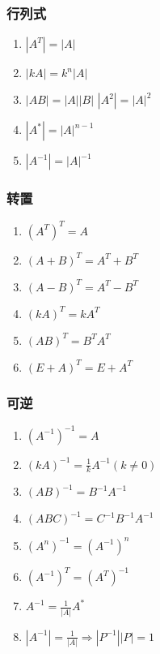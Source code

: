 \documentclass[a4paper,12pt]{article}
\begin{document}
    \subsubsection{行列式}

    \begin{enumerate}
        \item $|A^T| = |A|$
        \item $|kA| = k^{n}|A|$
        \item $|AB| = |A||B|$ \;\text{,} $|A^2| = |A|^2$
        \item $|A^*| = |A|^{n-1}$
        \item $|A^{-1}| = |A|^{-1}$
    \end{enumerate}

    \subsubsection{转置}

    \begin{enumerate}
        \item $(A^T)^T = A$
        \item $(A + B)^T = A^T + B^T$
        \item $(A - B)^T = A^T - B^T$
        \item $(kA)^T = kA^T$
        \item $(AB)^T = B^{T}A^T $
        \item $(E + A)^T = E + A^T $
    \end{enumerate}

    \subsubsection{可逆}

    \begin{enumerate}
        \item $(A^{-1})^{-1} = A$
        \item $(kA)^{-1} = \frac{1}{k}A^{-1}(k \neq 0)$
        \item $(AB)^{-1} = B^{-1}A^{-1}$
        \item $(ABC)^{-1} = C^{-1}B^{-1}A^{-1}$
        \item $(A^n)^{-1} = (A^{-1})^n$
        \item $(A^{-1})^T = (A^T)^{-1}$
        \item $A^{-1} = \frac{1}{|A|}A^{*}$
        \item $|A^{-1}| = \frac{1}{|A|} \Rightarrow |P^{-1}||P| = 1$
    \end{enumerate}
\end{document}
